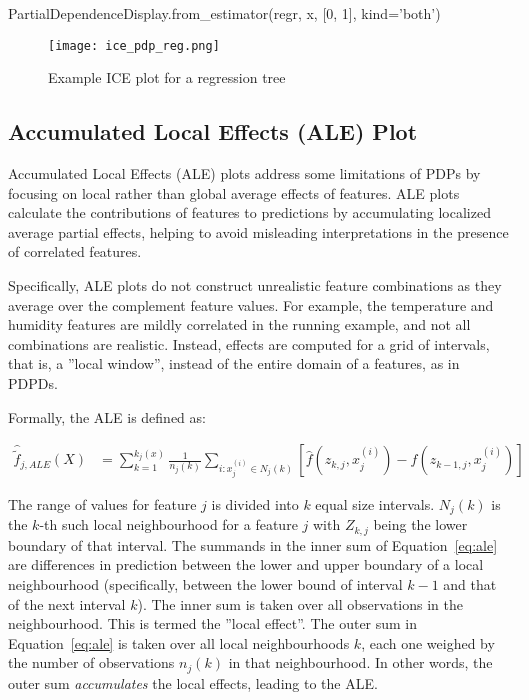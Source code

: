 \begin{pythoncode}
PartialDependenceDisplay.from_estimator(regr, x, [0, 1], kind='both')
\end{pythoncode}

\begin{figure}
\centering

\texttt{[image: ice\_pdp\_reg.png]}
\caption{Example ICE plot for a regression tree}
\label{fig:ice}
\end{figure}


\subsection{Accumulated Local Effects (ALE) Plot}

Accumulated Local Effects (ALE) plots address some limitations of PDPs by focusing on local rather than global average effects of features. ALE plots calculate the contributions of features to predictions by accumulating localized average partial effects, helping to avoid misleading interpretations in the presence of correlated features. 

Specifically, ALE plots do not construct unrealistic feature combinations as they average over the complement feature values. For example, the temperature and humidity features are mildly correlated in the running example, and not all combinations are realistic. Instead, effects are computed for a grid of intervals, that is, a ''local window'', instead of the entire domain of a features, as in PDPDs.

Formally, the ALE is defined as:

\begin{align}
\hat{\tilde{f}}_{j, ALE}(X) &= \sum_{k=1}^{k_j(x)} \frac{1}{n_j(k)} \sum_{i:x_j^{(i)} \in N_j(k)} \left[\hat{f}(z_{k, j}, x^{(i)}_j) - \hat{f} (z_{k-1, j},x^{(i)}_j) \right] \label{eq:ale}
\end{align}

The range of values for feature $j$ is divided into $k$ equal size intervals. $N_j(k)$ is the $k$-th such local neighbourhood for a feature $j$ with $Z_{k,j}$ being the lower boundary of that interval. The summands in the inner sum of Equation~\ref{eq:ale} are differences in prediction between the lower and upper boundary of a local neighbourhood (specifically, between the lower bound of interval $k-1$ and that of the next interval $k$). The inner sum is taken over all observations in the neighbourhood. This is termed the ''local effect''. The outer sum in Equation~\ref{eq:ale} is taken over all local neighbourhoods $k$, each one weighed by the number of observations $n_j(k)$ in that neighbourhood. In other words, the outer sum \emph{accumulates} the local effects, leading to the ALE.

